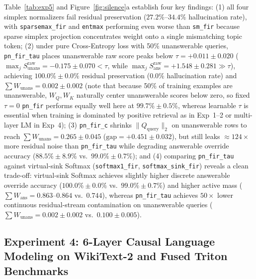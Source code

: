 \documentclass[11pt,a4paper]{article}
\begin{document}
Table~\ref{tab:exp5} and Figure~\ref{fig:silence}a establish four key findings: (1) all four simplex normalizers fail residual preservation ($27.2\%\text{--}34.4\%$ hallucination rate), with \texttt{sparsemax\_fir} and \texttt{entmax} performing even worse than \texttt{sm\_fir} because sparse simplex projection concentrates weight onto a single mismatching topic token; (2) under pure Cross-Entropy loss with 50\% unanswerable queries, \texttt{pn\_fir\_tau} places unanswerable raw score peaks below $\tau = +0.011 \pm 0.020$ ($\max_j S^{\text{raw}}_{\text{unans}} = -0.175 \pm 0.070 < \tau$, while $\max_j S^{\text{raw}}_{\text{ans}} = +1.548 \pm 0.281 \gg \tau$), achieving $100.0\% \pm 0.0\%$ residual preservation ($0.0\%$ hallucination rate) and $\sum W_{\text{unans}} = 0.002 \pm 0.002$ (note that because 50\% of training examples are unanswerable, $W_Q, W_K$ naturally center unanswerable scores below zero, so fixed $\tau=0$ \texttt{pn\_fir} performs equally well here at $99.7\% \pm 0.5\%$, whereas learnable $\tau$ is essential when training is dominated by positive retrieval as in Exp~1--2 or multi-layer LM in Exp~4); (3) \texttt{pn\_fir\_c} shrinks $\|Q_{\text{query}}\|_2$ on unanswerable rows to reach $\sum W_{\text{unans}} = 0.265 \pm 0.045$ ($\text{gap} = +0.451 \pm 0.032$), but still leaks $\approx 124\times$ more residual noise than \texttt{pn\_fir\_tau} while degrading answerable override accuracy ($88.5\% \pm 8.9\%$ vs.\ $99.0\% \pm 0.7\%$); and (4) comparing \texttt{pn\_fir\_tau} against virtual-sink Softmax (\texttt{softmax1\_fir}, \texttt{softmax\_sink\_fir}) reveals a clean trade-off: virtual-sink Softmax achieves slightly higher discrete answerable override accuracy ($100.0\% \pm 0.0\%$ vs.\ $99.0\% \pm 0.7\%$) and higher active mass ($\sum W_{\text{ans}} = 0.863\text{--}0.864$ vs.\ $0.744$), whereas \texttt{pn\_fir\_tau} achieves $50\times$ lower continuous residual-stream contamination on unanswerable queries ($\sum W_{\text{unans}} = 0.002 \pm 0.002$ vs.\ $0.100 \pm 0.005$).

\subsection{Experiment 4: 6-Layer Causal Language Modeling on WikiText-2 and Fused Triton Benchmarks}
\end{document}
